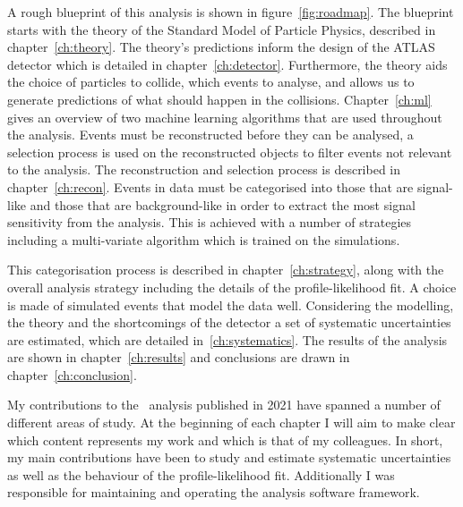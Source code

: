 A rough blueprint of this analysis is shown in figure~\ref{fig:roadmap}.%
 The blueprint starts with the theory of
the Standard Model of Particle Physics, described in chapter~\ref{ch:theory}.
The theory's predictions inform the design of the ATLAS detector which is
detailed in chapter~\ref{ch:detector}. Furthermore, the theory aids the choice
of particles to collide, which events to analyse, and allows us to generate
predictions of what should happen in the collisions. Chapter~\ref{ch:ml} gives
an overview of two machine learning algorithms that are used throughout the
analysis. Events must be reconstructed before they can be analysed, a selection
process is used on the reconstructed objects to filter events not relevant to
the analysis. The reconstruction and selection process is described in
chapter~\ref{ch:recon}. Events in data must be categorised into those that are
signal-like and those that are background-like in order to extract the most
signal sensitivity from the analysis. This is achieved with a number of
strategies including a multi-variate algorithm which is trained on the
simulations.

This categorisation process is described in chapter~\ref{ch:strategy}, along
with the overall analysis strategy including the details of the
profile-likelihood fit. A choice is made of simulated events that model the
data well. Considering the modelling, the theory and the shortcomings of the detector
a set of systematic uncertainties are estimated, which are detailed
in~\ref{ch:systematics}. The results of the analysis are shown in
chapter~\ref{ch:results} and conclusions are drawn in
chapter~\ref{ch:conclusion}.

My contributions to the \VHbb\ analysis published in 2021 have spanned a number
of different areas of study. At the beginning of each chapter I will aim to make
clear which content represents my work and which is that of my colleagues. In
short, my main contributions have been to study and estimate systematic
uncertainties as well as the behaviour of the profile-likelihood fit.
Additionally I was responsible for maintaining and operating the analysis
software framework.

